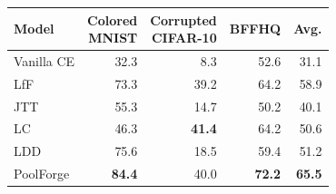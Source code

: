 \begin{tabular}[t]{@{}lrrrr@{}}
\toprule
Model&\shortstack{Colored\\MNIST}&\shortstack{Corrupted\\CIFAR-10}&BFFHQ&Avg.\\
\midrule
Vanilla CE&32.3&8.3&52.6&31.1\\
LfF&73.3&39.2&64.2&58.9\\
JTT&55.3&14.7&50.2&40.1\\
LC&46.3&\textbf{41.4}&64.2&50.6\\
LDD&75.6&18.5&59.4&51.2\\
PoolForge&\textbf{84.4}&40.0&\textbf{72.2}&\textbf{65.5}\\
\bottomrule
\end{tabular}
